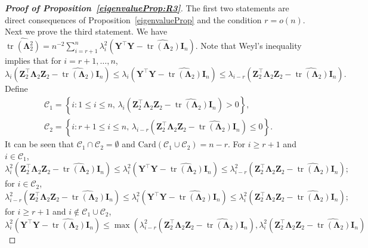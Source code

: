 \documentclass[12pt]{article} %
\DeclareMathOperator{\mytr}{tr}
\newcommand{\bZ}{\mathbf{Z}}
\newcommand{\bY}{\mathbf{Y}}
\newcommand{\bI}{\mathbf{I}}
\newcommand{\bfsym}[1]{\ensuremath{\boldsymbol{#1}}}
\def\bLambda {\bfsym {\Lambda}}
\theoremstyle{definition}
\begin{document}
\begin{appendices}
\begin{proof}[\textbf{Proof of Proposition~\ref{eigenvalueProp:R3}}]
    The first two statements are direct consequences of Proposition~\ref{eigenvalueProp} and the condition $r=o(n)$.
    Next we prove the third statement.
    We have
        $
        \widehat{\mytr(\bLambda_2^2)}
        =
        n^{-2}\sum_{i=r+1}^n \lambda_i^2(\bY^\top \bY-\widehat{\mytr(\bLambda_2)}\bI_n)
        $.
        Note that Weyl's inequality implies that for $i=r+1,\ldots,n$,
        \begin{equation*}
            \lambda_{i}(\bZ_2^\top \bLambda_2 \bZ_2 - \widehat{\mytr(\bLambda_2)}\bI_n)
            \leq
            \lambda_i(\bY^\top \bY-\widehat{\mytr(\bLambda_2)}\bI_n)
            \leq
            \lambda_{i-r}(\bZ_2^\top \bLambda_2 \bZ_2 - \widehat{\mytr(\bLambda_2)}\bI_n).
        \end{equation*}
Define
\begin{align*}
&\mathcal{C}_1=
\left\{i:
    1\leq i\leq n,\, \lambda_i\left(\bZ_2^\top \bLambda_2 \bZ_2-\widehat{\mytr(\bLambda_2)}\bI_n\right)> 0
\right\},
\\
&\mathcal{C}_2=
\left\{i:
    r+1\leq i\leq n, \,
    \lambda_{i-r}\left(\bZ_2^\top \bLambda_2 \bZ_2-\widehat{\mytr(\bLambda_2)}\bI_n\right)\leq 0
\right\}.
\end{align*}
It can be seen that $\mathcal{C}_1\cap \mathcal{C}_2 =\emptyset$ and $\text{Card}(\mathcal{C}_1\cup\mathcal{C}_2)= n - r$.
For $i\geq r+1$ and $i\in \mathcal{C}_1$,
    \begin{equation*}
        \lambda_i^2(\bZ_2^\top \bLambda_2 \bZ_2-\widehat{\mytr(\bLambda_2)}\bI_n) \leq \lambda_i^2(\bY^\top \bY-\widehat{\mytr(\bLambda_2)}\bI_n)\leq \lambda_{i-r}^2(\bZ_2^\top \bLambda_2 \bZ_2-\widehat{\mytr(\bLambda_2)}\bI_n);
    \end{equation*}
for $i\in \mathcal{C}_2$,
    \begin{equation*}
        \lambda_{i-r}^2(\bZ_2^\top \bLambda_2 \bZ_2-\widehat{\mytr(\bLambda_2)}\bI_n) \leq \lambda_i^2(\bY^\top \bY-\widehat{\mytr(\bLambda_2)}\bI_n)\leq \lambda_{i}^2(\bZ_2^\top \bLambda_2 \bZ_2-\widehat{\mytr(\bLambda_2)}\bI_n);
    \end{equation*}
    for $i\geq r+1$ and $i\notin \mathcal{C}_1\cup \mathcal{C}_2$,
    \begin{equation*}
        \lambda_i^2(\bY^\top \bY-\widehat{\mytr(\bLambda_2)}\bI_n)\leq
        \max
        \left(
            \lambda_{i-r}^2(\bZ_2^\top \bLambda_2 \bZ_2-\widehat{\mytr(\bLambda_2)}\bI_n) 
        ,
        \lambda_{i}^2(\bZ_2^\top \bLambda_2 \bZ_2-\widehat{\mytr(\bLambda_2)}\bI_n)

\end{equation*}
\end{proof}
\end{appendices}
\end{document}
